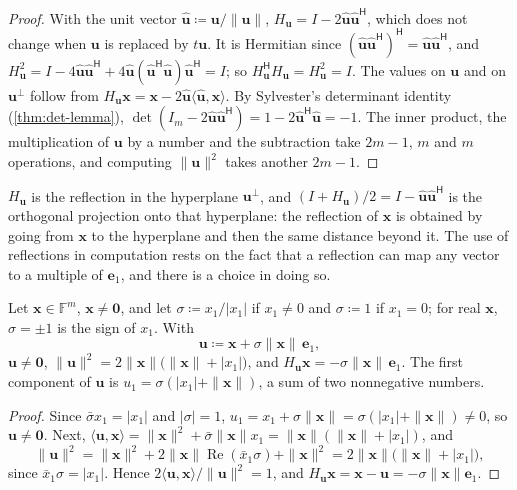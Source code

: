 \begin{proof}
With the unit vector $\hat{\mathbf u}\coloneqq\mathbf u/\|\mathbf u\|$, $H_{\mathbf u}=I-2\hat{\mathbf u}\hat{\mathbf u}^{\mathsf H}$, which does not change when $\mathbf u$ is replaced by $t\mathbf u$. It is Hermitian since $(\hat{\mathbf u}\hat{\mathbf u}^{\mathsf H})^{\mathsf H}=\hat{\mathbf u}\hat{\mathbf u}^{\mathsf H}$, and $H_{\mathbf u}^2=I-4\hat{\mathbf u}\hat{\mathbf u}^{\mathsf H}+4\hat{\mathbf u}(\hat{\mathbf u}^{\mathsf H}\hat{\mathbf u})\hat{\mathbf u}^{\mathsf H}=I$; so $H_{\mathbf u}^{\mathsf H}H_{\mathbf u}=H_{\mathbf u}^2=I$. The values on $\mathbf u$ and on $\mathbf u^\perp$ follow from $H_{\mathbf u}\mathbf x=\mathbf x-2\hat{\mathbf u}\langle\hat{\mathbf u},\mathbf x\rangle$. By Sylvester's determinant identity (\cref{thm:det-lemma}), $\det(I_m-2\hat{\mathbf u}\hat{\mathbf u}^{\mathsf H})=1-2\hat{\mathbf u}^{\mathsf H}\hat{\mathbf u}=-1$. The inner product, the multiplication of $\mathbf u$ by a number and the subtraction take $2m-1$, $m$ and $m$ operations, and computing $\|\mathbf u\|^2$ takes another $2m-1$.
\end{proof}

$H_{\mathbf u}$ is the reflection in the hyperplane $\mathbf u^\perp$, and $(I+H_{\mathbf u})/2=I-\hat{\mathbf u}\hat{\mathbf u}^{\mathsf H}$ is the orthogonal projection onto that hyperplane: the reflection of $\mathbf x$ is obtained by going from $\mathbf x$ to the hyperplane and then the same distance beyond it. The use of reflections in computation rests on the fact that a reflection can map any vector to a multiple of $\mathbf e_1$, and there is a choice in doing so.

\begin{theorem}
\label{thm:householder-vector}
Let $\mathbf x\in\mathbb F^m$, $\mathbf x\ne\mathbf 0$, and let $\sigma\coloneqq x_1/|x_1|$ if $x_1\ne0$ and $\sigma\coloneqq1$ if $x_1=0$; for real $\mathbf x$, $\sigma=\pm1$ is the sign of $x_1$. With
\[
\mathbf u\coloneqq\mathbf x+\sigma\|\mathbf x\|\,\mathbf e_1 ,
\]
$\mathbf u\ne\mathbf 0$, $\|\mathbf u\|^2=2\|\mathbf x\|\bigl(\|\mathbf x\|+|x_1|\bigr)$, and $H_{\mathbf u}\mathbf x=-\sigma\|\mathbf x\|\,\mathbf e_1$. The first component of $\mathbf u$ is $u_1=\sigma(|x_1|+\|\mathbf x\|)$, a sum of two nonnegative numbers.
\end{theorem}

\begin{proof}
Since $\bar\sigma x_1=|x_1|$ and $|\sigma|=1$, $u_1=x_1+\sigma\|\mathbf x\|=\sigma(|x_1|+\|\mathbf x\|)\ne0$, so $\mathbf u\ne\mathbf 0$. Next, $\langle\mathbf u,\mathbf x\rangle=\|\mathbf x\|^2+\bar\sigma\|\mathbf x\|x_1=\|\mathbf x\|(\|\mathbf x\|+|x_1|)$, and
\[
\|\mathbf u\|^2=\|\mathbf x\|^2+2\|\mathbf x\|\operatorname{Re}(\bar x_1\sigma)+\|\mathbf x\|^2=2\|\mathbf x\|\bigl(\|\mathbf x\|+|x_1|\bigr),
\]
since $\bar x_1\sigma=|x_1|$. Hence $2\langle\mathbf u,\mathbf x\rangle/\|\mathbf u\|^2=1$, and $H_{\mathbf u}\mathbf x=\mathbf x-\mathbf u=-\sigma\|\mathbf x\|\mathbf e_1$.
\end{proof}

